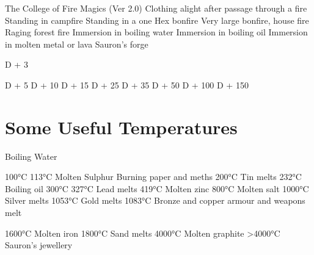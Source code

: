 \begin{Chapter}{The College of Fire Magics (Ver 2.0)}
Clothing alight after passage through 
a fire 
Standing in campfire 
Standing in a one Hex bonfire 
Very large bonfire, house fire 
Raging forest fire 
Immersion in boiling water 
Immersion in boiling oil 
Immersion in molten metal or lava 
Sauron’s forge 

D + 3 

D + 5 
D + 10 
D + 15 
D + 25 
D + 35 
D + 50 
D + 100 
D + 150 

\section{Some Useful Temperatures}

Boiling Water 

100°C 
113°C  Molten Sulphur 
Burning paper and meths 
200°C 
Tin melts 
232°C 
Boiling oil 
300°C 
327°C 
Lead melts 
419°C  Molten zinc 
800°C  Molten salt 
1000°C  Silver melts 
1053°C  Gold melts 
1083°C  Bronze and copper armour and weapons melt 

1600°C  Molten iron 
1800°C  Sand melts 
4000°C  Molten graphite 
>4000°C  Sauron’s jewellery 

\end{Chapter}
